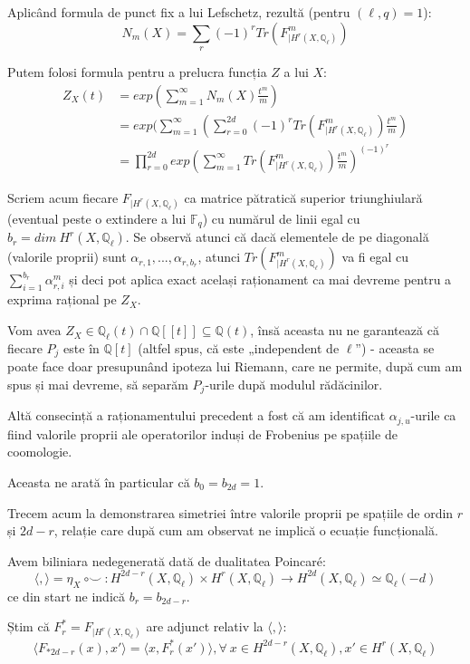 \documentclass[13pt,openany]{book}
\begin{document}
Aplicând formula de punct fix a lui Lefschetz, rezultă (pentru $(\ell,q)=1$):
$$N_m(X) = \sum\limits_r (-1)^r Tr(F^m_{\mid  H^r(X,\mathbb{Q}_\ell)})$$

Putem folosi formula pentru a prelucra funcția $Z$ a lui $X$:
\begin{align*}
Z_X(t)&=exp(\sum\limits_{m=1}^{\infty} N_m(X) \frac{t^m}{m})\\
&=exp(\sum\limits_{m=1}^{\infty} (\sum\limits_{r=0}^{2d} (-1)^r Tr(F^m_{\mid  H^r(X,\mathbb{Q}_\ell)}) \frac{t^m}{m})\\
&=\prod\limits_{r=0}^{2d}exp(\sum\limits_{m=1}^{\infty}Tr(F^m_{\mid  H^r(X,\mathbb{Q}_\ell)})  \frac{t^m}{m}) ^ { (-1)^r }
\end{align*}

Scriem acum fiecare $F_{\mid  H^r(X,\mathbb{Q}_\ell)}$ ca matrice pătratică superior triunghiulară (eventual peste o extindere a lui $\mathbb{F}_q$) cu numărul de linii egal cu $b_r=dim\ H^r(X,\mathbb{Q}_\ell)$. Se observă atunci că dacă elementele de pe diagonală (valorile proprii) sunt $\alpha_{r,1},...,\alpha_{r,b_r}$, atunci $Tr(F^m_{\mid  H^r(X,\mathbb{Q}_\ell)})$ va fi egal cu $\sum\limits_{i=1}^{b_r} \alpha_{r,i}^m$ și deci pot aplica exact același raționament ca mai devreme pentru a exprima rațional pe $Z_X$.

Vom avea $Z_X \in \mathbb{Q}_\ell(t) \cap \mathbb{Q}[[t]] \subseteq \mathbb{Q}(t)$, însă aceasta nu ne garantează că fiecare $P_j$ este în $\mathbb{Q}[t]$ (altfel spus, că este „independent de $\ell$”) - aceasta se poate face doar presupunând ipoteza lui Riemann, care ne permite, după cum am spus și mai devreme, să separăm $P_j$-urile după modulul rădăcinilor.

Altă consecință a raționamentului precedent a fost că am identificat $\alpha_{j,u}$-urile ca fiind valorile proprii ale operatorilor induși de Frobenius pe spațiile de coomologie.

Aceasta ne arată în particular că $b_0=b_{2d}=1$.

Trecem acum la demonstrarea simetriei între valorile proprii pe spațiile de ordin $r$ și $2d-r$, relație care după cum am observat ne implică o ecuație funcțională.

Avem biliniara nedegenerată dată de dualitatea Poincaré:
$$\langle,\rangle=\eta_X\ \circ \smile\ : H^{2d-r}(X,\mathbb{Q}_\ell) \times H^{r}(X,\mathbb{Q}_\ell) \rightarrow H^{2d}(X,\mathbb{Q}_\ell) \simeq \mathbb{Q}_\ell(-d)$$
ce din start ne indică $b_r=b_{2d-r}$.

Știm că $F^*_r=F_{\mid  H^r(X,\mathbb{Q}_\ell)}$ are adjunct relativ la $\langle,\rangle$:
$$\langle F_{*2d-r}(x),x'\rangle=\langle x,F^*_r(x')\rangle, \forall\ x \in H^{2d-r}(X,\mathbb{Q}_\ell), x' \in H^{r}(X,\mathbb{Q}_\ell)$$
\end{document}
